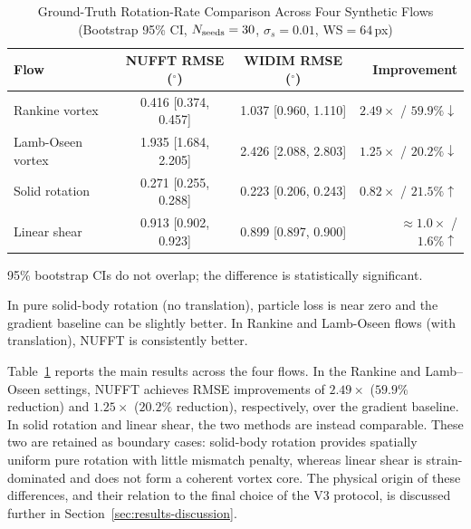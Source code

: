 \documentclass[lettersize,journal]{IEEEtran}
\begin{document}
\begin{table}[!htbp]
  \renewcommand{\arraystretch}{1.2}
  \setlength{\tabcolsep}{5pt}
  \caption{Ground-Truth Rotation-Rate Comparison Across Four Synthetic Flows
    (Bootstrap 95\% CI, $N_{\rm seeds}=30$, $\sigma_s=0.01$, WS$=64$\,px)}
  \label{tab:gt_vorticity}
  \centering
  \small
  \begin{threeparttable}
    \begin{tabular}{lccr}
      \toprule
      Flow & NUFFT RMSE ($^\circ$) & WIDIM RMSE ($^\circ$) & Improvement \\
      \midrule
      Rankine vortex & 0.416 [0.374, 0.457] & 1.037 [0.960, 1.110] & $2.49\times$ / $59.9\%\downarrow$\tnote{*} \\
      Lamb-Oseen vortex & 1.935 [1.684, 2.205] & 2.426 [2.088, 2.803] & $1.25\times$ / $20.2\%\downarrow$\tnote{*} \\
      Solid rotation & 0.271 [0.255, 0.288] & 0.223 [0.206, 0.243] & $0.82\times$ / $21.5\%\uparrow$\tnote{\dag} \\
      Linear shear & 0.913 [0.902, 0.923] & 0.899 [0.897, 0.900] & $\approx 1.0\times$ / $1.6\%\uparrow$ \\
      \bottomrule
    \end{tabular}
    \begin{tablenotes}
      \footnotesize
      \item[*] 95\% bootstrap CIs do not overlap; the difference is statistically significant.
      \item[\dag] In pure solid-body rotation (no translation), particle loss is near zero and
                  the gradient baseline can be slightly better. In Rankine and Lamb-Oseen flows
                  (with translation), NUFFT is consistently better.
    \end{tablenotes}
  \end{threeparttable}
\end{table}

Table~\ref{tab:gt_vorticity} reports the main results across the four flows.
In the Rankine and Lamb--Oseen settings, NUFFT achieves RMSE improvements of
$2.49\times$ ($59.9\%$ reduction) and $1.25\times$ ($20.2\%$ reduction), respectively, over the gradient baseline.
In solid rotation and linear shear, the two methods are instead comparable.
These two are retained as boundary cases: solid-body rotation provides spatially uniform pure rotation with little mismatch penalty, whereas linear shear is strain-dominated and does not form a coherent vortex core.
The physical origin of these differences,
and their relation to the final choice of the V3 protocol,
is discussed further in Section~\ref{sec:results-discussion}.
\end{document}
